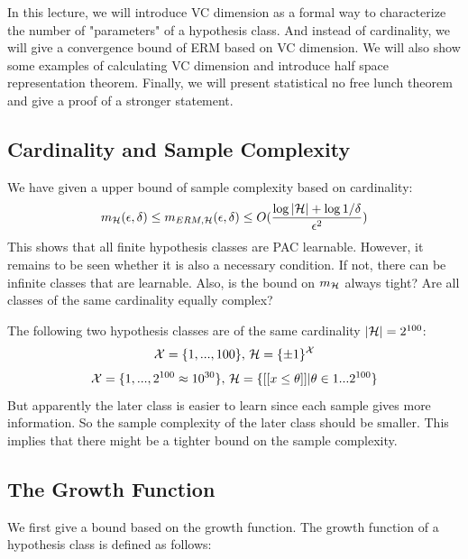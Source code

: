 \documentclass{article}
\begin{document}

In this lecture, we will introduce VC dimension as a formal way to characterize the number of "parameters" of a hypothesis class. And instead of cardinality, we will give a convergence bound of ERM based on VC dimension. We will also show some examples of calculating VC dimension and introduce half space representation theorem. Finally, we will present statistical no free lunch theorem and give a proof of a stronger statement.

\subsection{Cardinality and Sample Complexity}
We have given a upper bound of sample complexity based on cardinality:
\begin{displaymath}
  m_{\mathcal{H}}(\epsilon, \delta)\leq m_{ERM,\mathcal{H}}(\epsilon, \delta)\leq O(\frac{\log{|\mathcal{H}|}+\log{1/\delta}}{\epsilon^2})
\end{displaymath}
This shows that all finite hypothesis classes are PAC learnable. However, it remains to be seen whether it is also a necessary condition. If not, there can be infinite classes that are learnable. Also, is the bound on $m_{\mathcal{H}}$ always tight? Are all classes of the same cardinality equally complex? 
\begin{example}
	The following two hypothesis classes are of the same cardinality $|\mathcal{H}|=2^{100}$:
\begin{displaymath}
	\mathcal{X}=\{1,...,100\},\,\mathcal{H}=\{\pm1\}^{\mathcal{X}} 
\end{displaymath}
\begin{displaymath}
	\mathcal{X}=\{1,...,2^{100}\approx 10^{30}\},\,\mathcal{H}=\{[[x\leq \theta]]|\theta\in 1...2^{100}\}
\end{displaymath}
But apparently the later class is easier to learn since each sample gives more information. So the sample complexity of the later class should be smaller. This implies that there might be a tighter bound on the sample complexity.
\end{example}


\subsection{The Growth Function}
We first give a bound based on the growth function. The growth function of a hypothesis class is defined as follows:
\end{document}
